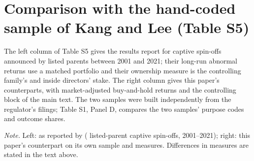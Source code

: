 \documentclass[12pt]{article}
\newcommand{\tabnote}[1]{\par\vspace{4pt}\begin{minipage}{\linewidth}\singlespacing\small\emph{Note.} #1\end{minipage}}
\newcommand{\captive}{captive spin-off}
\begin{document}
\section{Comparison with the hand-coded sample of Kang and Lee (Table S5)}
The left column of Table S5 gives the results  report for \KLN{} \captive{}s announced by listed parents between 2001 and 2021; their long-run abnormal returns use a matched portfolio and their ownership measure is the controlling family's and inside directors' stake. The right column gives this paper's counterparts, with market-adjusted buy-and-hold returns and the controlling block of the main text. The two samples were built independently from the regulator's filings; Table S1, Panel D, compares the two samples' purpose codes and outcome shares.
\begin{table}[htbp]\centering\caption{The tests of Kang and Lee (2025) and their counterparts here}\label{tab:s_mirror}
{\footnotesize\setlength{\tabcolsep}{3pt}}\tabnote{Left: as reported by  (\KLN{} listed-parent \captive{}s, 2001--2021); right: this paper's counterpart on its own sample and measures. Differences in measures are stated in the text above.}\end{table}
\end{document}
